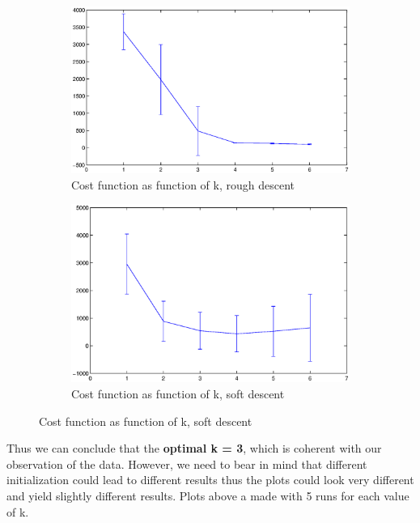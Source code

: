 \documentclass{article}
\begin{document}
\begin{enumerate}
		\begin{figure}[h]
			\centering
			\begin{subfigure}{.6\textwidth}
				\includegraphics[width=.9\linewidth]{errobar_k_rough.eps}
				\caption{Cost function as function of k, rough descent}
				\label{fig:sub1}
			\end{subfigure}%
			\begin{subfigure}{.52\textwidth}
				\includegraphics[width=.9\linewidth]{errobar_k_smooth.eps}
				\caption{Cost function as function of k, soft descent}
				\label{fig:sub1}
			\end{subfigure}
		\end{figure}

		Thus we can conclude that the \textbf{optimal k = 3}, which is coherent with our observation of the data.
		However, we need to bear in mind that different initialization could lead to different results thus the plots could look very different and yield slightly different results. Plots above a made with 5 runs for each value of k.  
		

\end{enumerate}
\end{document}

